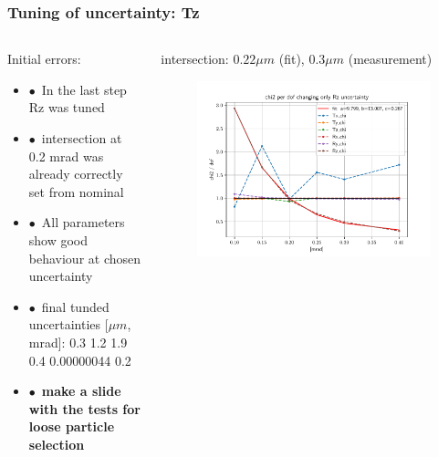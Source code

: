 \documentclass[aspectratio=1610, 12pt, xcolor=dvipsnames]{beamer}
\begin{document}
\begin{frame}\frametitle{Tuning of uncertainty: Tz}
  \begin{columns}
    \begin{column}[c]{0.48\textwidth}
      Initial errors:
      \begin{itemize}
        \setlength\itemsep{0em}
        \item $\bullet$\, In the last step Rz was tuned
        \item $\bullet$\, intersection at 0.2 mrad was already correctly set from nominal
        \item $\bullet$\, All parameters show good behaviour at chosen uncertainty
        \item $\bullet$\, final tunded uncertainties [$\mu m$, mrad]: 0.3 1.2 1.9 0.4 0.00000044 0.2
        \item $\bullet$\, \textbf{make a slide with the tests for loose particle selection}
      \end{itemize}
    \end{column}
      \begin{column}[c]{0.48\textwidth}
        intersection: $0.22 \mu m$ (fit), $0.3 \mu m$ (measurement)
        \begin{figure}
          \includegraphics[width=\textwidth]{plots/retest/only_Rz_variable_full_fit.pdf}
        \end{figure}
      \end{column}
  \end{columns}
\end{frame}
\end{document}
